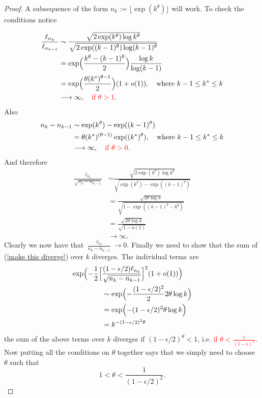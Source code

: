\begin{proof}
A subsequence of the form $n_k := \lfloor\exp(k^\theta)\rfloor$ will work. To check the conditions notice

\begin{align*}
\frac{\ell_{n_k}}{\ell_{n_{k-1}}}
& \sim \frac{ \sqrt{2 \exp(k^\theta) \log k^\theta} }{\sqrt{2 \exp((k-1)^\theta) \log (k-1)^\theta}} \\
& =  \exp\Bigl(\frac{k^\theta - (k-1)^\theta}{2}\Bigr) \frac{\log k}{\log (k-1)}  \\
& =  \exp\Bigl(\frac{\theta(k^*)^{\theta-1}}{2}\Bigr) (1 + o(1)),\quad\text{where $k-1\leq k^*\leq k$} \\
& \longrightarrow  \infty, \quad\text{\textcolor{red}{if  $\theta > 1$}.}
\end{align*}
Also
\begin{align*}
n_k - n_{k-1} & \sim  \exp(k^\theta) - \exp((k-1)^\theta) \\
&= \theta (k^*)^{(\theta-1)} \exp((k^*)^\theta) ,\quad\text{where $k-1\leq k^*\leq k$} \\
&\longrightarrow \infty,\quad\text{\textcolor{red}{if $\theta > 0 $.}}
\end{align*}
And therefore
\begin{align*}
\frac{\ell_{n_k}}{\sqrt{n_k - n_{k-1}}}
& \sim \frac{\sqrt{2 \exp(k^\theta) \log k^\theta}}{\sqrt{ \exp(k^\theta) - \exp((k-1)^\theta) }}   \\
&  = \frac{\sqrt{2\theta\log k}}{\sqrt{ 1 - \exp((k-1)^\theta-k^\theta)  }}  \\
& = \frac{\sqrt{2\theta\log k}}{\sqrt{ 1 - o(1)  }}\\
& \longrightarrow \infty.
\end{align*}
Clearly we now have that  $\frac{\ell_{n_k}}{{n_k - n_{k-1}}}  \longrightarrow 0.$
Finally we need to show that the sum of (\ref{make this diverge}) over $k$ diverges.  The individual terms are
\begin{align*}
\exp\Bigl(-\frac{1}{2}\Bigl[&\frac{(1-\epsilon/2)\ell_{n_k}}{\sqrt{n_k - n_{k-1}}}\Bigr]^2(1+o(1))  \Bigr) \\
& \sim \exp\Bigl(-\frac{(1-\epsilon/2)^2}{2}2\theta \log k   \Bigr) \\
& = \exp\Bigl(-{(1-\epsilon/2)^2}\theta \log k   \Bigr) \\
& = k ^ {-{(1-\epsilon/2)^2}\theta}
\end{align*}
the sum of the above terms over $k$ diverges if $(1-\epsilon/2)^\theta  < 1$, i.e. \textcolor{red}{ if $\theta < \frac{1}{(1-\epsilon)^2}$}. Now putting all the  conditions on $\theta$ together says that we simply need to choose $\theta$ such that
\[ 1<\theta <\frac{1}{(1-\epsilon/2)^2} .\]
\end{proof}



